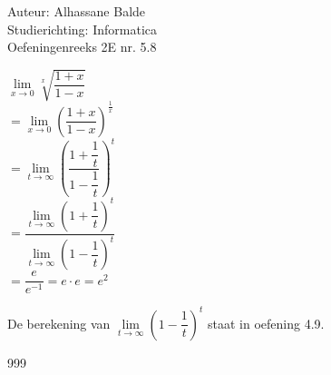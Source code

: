 \documentclass[a4paper]{article}
\begin{document}
  
\noindent \large Auteur: Alhassane Balde\\
\noindent \large Studierichting: Informatica\\
\noindent \large Oefeningenreeks 2E nr. 5.8\\

\medskip

\normalsize

$\lim\limits_{x \rightarrow 0} \sqrt[x]{ \dfrac{1+x}{1-x}}$\\

$= \lim\limits_{x \rightarrow 0} \left(\dfrac{1+x}{1-x}\right)^{\tfrac{1}{x}}$\\

$= \lim\limits_{t \rightarrow \infty} \left(\dfrac{1+\dfrac{1}{t}}{1-\dfrac{1}{t}}\right)^t$\\

$= \dfrac{\lim\limits_{t \rightarrow \infty} \left(1+\dfrac{1}{t}\right)^t}{\lim\limits_{t \rightarrow \infty} \left(1-\dfrac{1}{t}\right)^t}$\\

$= \dfrac{e}{e^{-1}} = e \cdot e = e^2$
    
De berekening van $\lim\limits_{t \rightarrow \infty} \left(1-\dfrac{1}{t}\right)^t$ staat in oefening 4.9.


\begin{thebibliography}{999}
\end{thebibliography}
\end{document}
